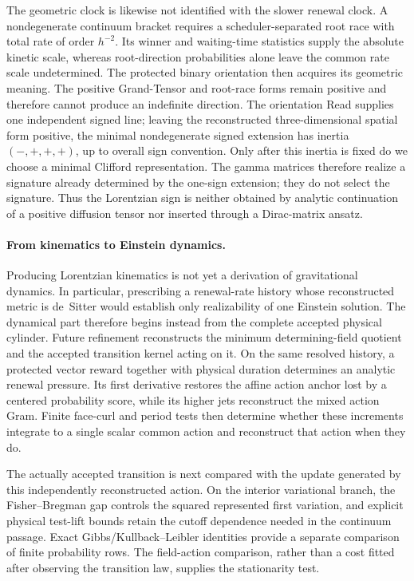 \documentclass[11pt]{article}
\theoremstyle{definition}
\theoremstyle{remark}
\begin{document}
The geometric clock is likewise not identified with the slower renewal clock.
A nondegenerate continuum bracket requires a scheduler-separated root race
with total rate of order $h^{-2}$.  Its winner and waiting-time statistics
supply the absolute kinetic scale, whereas root-direction probabilities alone
leave the common rate scale undetermined.  The protected binary orientation then acquires its geometric meaning.  The
positive Grand-Tensor and root-race forms remain positive and therefore cannot
produce an indefinite direction.  The orientation Read supplies one
independent signed line; leaving the reconstructed three-dimensional spatial
form positive, the minimal nondegenerate signed extension has inertia
$(-,+,+,+)$, up to overall sign convention.  Only after this inertia is fixed
do we choose a minimal Clifford representation.  The gamma matrices therefore
realize a signature already determined by the one-sign extension; they do not
select the signature.  Thus the Lorentzian sign is neither obtained by analytic
continuation of a positive diffusion tensor nor inserted through a Dirac-matrix
ansatz.

\paragraph{From kinematics to Einstein dynamics.}
Producing Lorentzian kinematics is not yet a derivation of gravitational
dynamics.  In particular, prescribing a renewal-rate history whose
reconstructed metric is de~Sitter would establish only realizability of one
Einstein solution.  The dynamical part therefore begins instead from the
complete accepted physical cylinder.  Future refinement reconstructs the
minimum determining-field quotient and the accepted transition kernel acting
on it.  On the same resolved history, a protected vector reward together with
physical duration determines an analytic renewal pressure.  Its first
derivative restores the affine action anchor lost by a centered probability
score, while its higher jets reconstruct the mixed action Gram.  Finite
face-curl and period tests then determine whether these increments integrate
to a single scalar common action and reconstruct that action when they do.

The actually accepted transition is next compared with the update generated
by this independently reconstructed action.  On the interior variational
branch, the Fisher--Bregman gap controls the squared represented first
variation, and explicit physical test-lift bounds retain the cutoff dependence
needed in the continuum passage.  Exact Gibbs/Kullback--Leibler identities
provide a separate comparison of finite probability rows.  The field-action
comparison, rather than a cost fitted after observing the transition law,
supplies the stationarity test.
\end{document}
